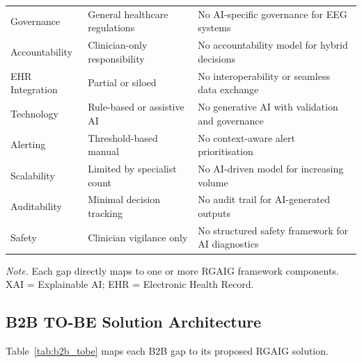 {\begin{xltabular}{\textwidth}{@{} >{\raggedright\arraybackslash}p{3.2cm} L L @{}}
\addlinespace
Governance & General healthcare regulations & No AI-specific governance for EEG systems \\
\addlinespace
Accountability & Clinician-only responsibility & No accountability model for hybrid decisions \\
\addlinespace
EHR Integration & Partial or siloed & No interoperability or seamless data exchange \\
\addlinespace
Technology & Rule-based or assistive AI & No generative AI with validation and governance \\
\addlinespace
Alerting & Threshold-based manual & No context-aware alert prioritisation \\
\addlinespace
Scalability & Limited by specialist count & No AI-driven model for increasing volume \\
\addlinespace
Auditability & Minimal decision tracking & No audit trail for AI-generated outputs \\
\addlinespace
Safety & Clinician vigilance only & No structured safety framework for AI diagnostics \\
\end{xltabular}}
\vspace{0.5em}
\noindent\textit{Note.} Each gap directly maps to one or more RGAIG framework components. XAI = Explainable AI; EHR = Electronic Health Record.
\fi


\iffalse %
\subsection{B2B TO-BE Solution Architecture}
\label{sec:b2b_tobe}

Table~\ref{tab:b2b_tobe} maps each B2B gap to its proposed RGAIG solution.


